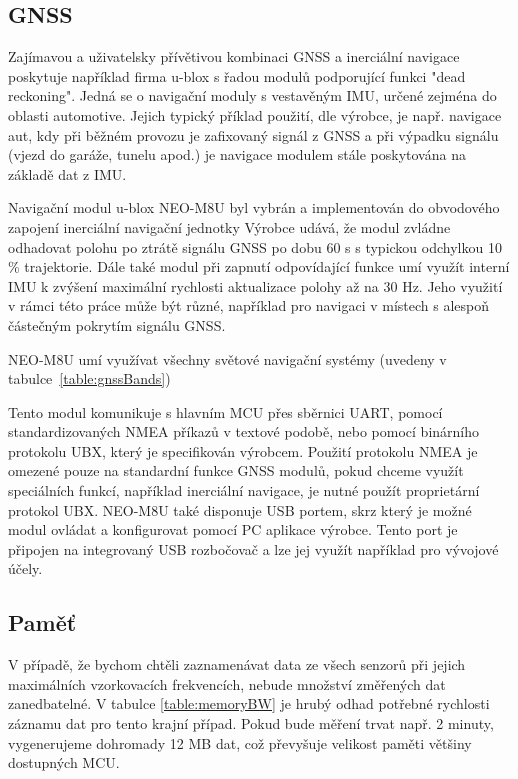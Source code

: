 \subsection{GNSS}
Zajímavou a uživatelsky přívětivou kombinaci GNSS a inerciální navigace poskytuje například firma u-blox s řadou modulů podporující funkci "dead reckoning". Jedná se o navigační moduly s vestavěným IMU, určené zejména do oblasti automotive. Jejich typický příklad použití, dle výrobce, je např. navigace aut, kdy při běžném provozu je zafixovaný signál z GNSS a při výpadku signálu (vjezd do garáže, tunelu apod.) je navigace modulem stále poskytována na základě dat z IMU. \cite{DLQg9bT6V1GWKhxh}

Navigační modul u-blox NEO-M8U byl vybrán a implementován do obvodového zapojení inerciální navigační jednotky
Výrobce udává, že modul zvládne odhadovat polohu po ztrátě signálu GNSS po dobu 60 s s typickou odchylkou 10 \% trajektorie. Dále také modul při zapnutí odpovídající funkce umí využít interní IMU k zvýšení maximální rychlosti aktualizace polohy až na 30 Hz. Jeho využití v rámci této práce může být různé, například pro navigaci v místech s alespoň částečným pokrytím signálu GNSS. \cite{DLQg9bT6V1GWKhxh}

NEO-M8U umí využívat všechny světové navigační systémy (uvedeny v tabulce~\ref{table:gnssBands})

Tento modul komunikuje s hlavním MCU přes sběrnici UART, pomocí standardizovaných NMEA příkazů v textové podobě, nebo pomocí binárního protokolu UBX, který je specifikován výrobcem. Použití protokolu NMEA je omezené pouze na standardní funkce GNSS modulů, pokud chceme využít speciálních funkcí, například inerciální navigace, je nutné použít proprietární protokol UBX. \cite{DLQg9bT6V1GWKhxh} NEO-M8U také disponuje USB portem, skrz který je možné modul ovládat a konfigurovat pomocí PC aplikace výrobce. Tento port je připojen na integrovaný USB rozbočovač a lze jej využít například pro vývojové účely.

\subsection{Paměť}

V případě, že bychom chtěli zaznamenávat data ze všech senzorů při jejich maximálních vzorkovacích frekvencích, nebude množství změřených dat zanedbatelné. V tabulce \ref{table:memoryBW} je hrubý odhad potřebné rychlosti záznamu dat pro tento krajní případ. Pokud bude měření trvat např. 2 minuty, vygenerujeme dohromady 12 MB dat, což převyšuje velikost paměti většiny dostupných MCU.

